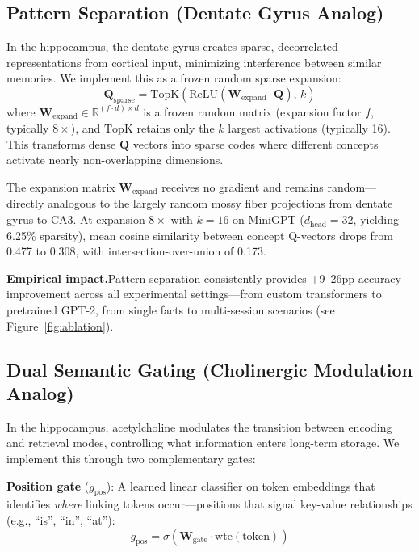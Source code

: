 \documentclass[11pt,a4paper]{article}
\begin{document}
\subsection{Pattern Separation (Dentate Gyrus Analog)}
\label{sec:pattern_sep}

In the hippocampus, the dentate gyrus creates sparse, decorrelated representations from cortical input, minimizing interference between similar memories. We implement this as a frozen random sparse expansion:
\begin{equation}
  \mathbf{Q}_{\text{sparse}} = \text{TopK}(\text{ReLU}(\mathbf{W}_{\text{expand}} \cdot \mathbf{Q}),\, k)
  \label{eq:pattern_sep}
\end{equation}
where $\mathbf{W}_{\text{expand}} \in \mathbb{R}^{(f \cdot d) \times d}$ is a frozen random matrix (expansion factor $f$, typically $8\times$), and $\text{TopK}$ retains only the $k$ largest activations (typically 16). This transforms dense $\mathbf{Q}$ vectors into sparse codes where different concepts activate nearly non-overlapping dimensions.

The expansion matrix $\mathbf{W}_{\text{expand}}$ receives no gradient and remains random---directly analogous to the largely random mossy fiber projections from dentate gyrus to CA3. At expansion $8\times$ with $k{=}16$ on MiniGPT ($d_{\text{head}}{=}32$, yielding 6.25\% sparsity), mean cosine similarity between concept Q-vectors drops from 0.477 to 0.308, with intersection-over-union of 0.173.

\textbf{Empirical impact.}\quad Pattern separation consistently provides +9--26pp accuracy improvement across all experimental settings---from custom transformers to pretrained GPT-2, from single facts to multi-session scenarios (see Figure~\ref{fig:ablation}).

\subsection{Dual Semantic Gating (Cholinergic Modulation Analog)}

In the hippocampus, acetylcholine modulates the transition between encoding and retrieval modes, controlling what information enters long-term storage. We implement this through two complementary gates:

\textbf{Position gate} ($g_{\text{pos}}$): A learned linear classifier on token embeddings that identifies \emph{where} linking tokens occur---positions that signal key-value relationships (e.g., ``is'', ``in'', ``at''):
\begin{equation}
  g_{\text{pos}} = \sigma(\mathbf{W}_{\text{gate}} \cdot \text{wte}(\text{token}))
  \label{eq:pos_gate}
\end{equation}
\end{document}
